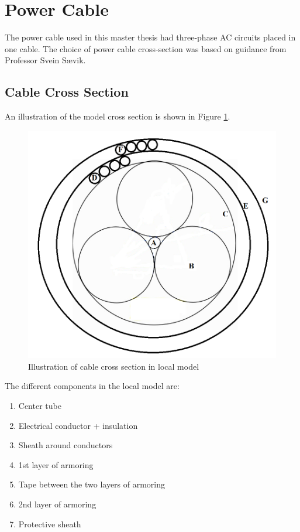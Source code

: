 \section{Power Cable}
 The power cable used in this master thesis had three-phase AC circuits placed in one cable. The choice of power cable cross-section was based on guidance from Professor Svein Sævik. 

\subsection{Cable Cross Section}
 An illustration of the model cross section is shown in Figure \ref{fig:cross2}. 

\begin{figure}[H]
\centering
\includegraphics[scale=0.9]{figures/cross2}
\caption[$\; \:$Cable cross section in local model]{Illustration of cable cross section in local model  }
 \label{fig:cross2}
\end{figure}

\noindent The different components in the local model are:
\begin{enumerate}[label=\Alph*]
\item Center tube
\item Electrical conductor + insulation
\item Sheath around conductors
\item 1st layer of armoring 
\item Tape between the two layers of armoring
\item 2nd layer of armoring
\item Protective sheath
\end{enumerate}

